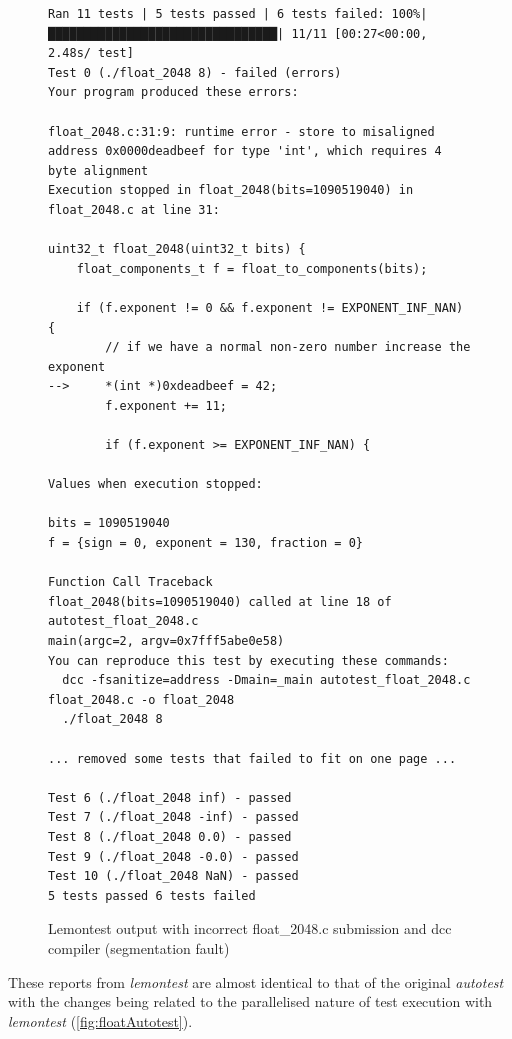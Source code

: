 \documentclass[hidelinks]{report}
\begin{document}
\begin{figure}[h]
	\centering
	\begin{lstlisting}[breaklines=true, linewidth=\linewidth, tabsize=4]
Ran 11 tests | 5 tests passed | 6 tests failed: 100%|████████████████████████████████| 11/11 [00:27<00:00,  2.48s/ test]
Test 0 (./float_2048 8) - failed (errors)
Your program produced these errors:

float_2048.c:31:9: runtime error - store to misaligned address 0x0000deadbeef for type 'int', which requires 4 byte alignment
Execution stopped in float_2048(bits=1090519040) in float_2048.c at line 31:

uint32_t float_2048(uint32_t bits) {
    float_components_t f = float_to_components(bits);

    if (f.exponent != 0 && f.exponent != EXPONENT_INF_NAN) {
        // if we have a normal non-zero number increase the exponent
-->     *(int *)0xdeadbeef = 42;
        f.exponent += 11;

        if (f.exponent >= EXPONENT_INF_NAN) {

Values when execution stopped:

bits = 1090519040
f = {sign = 0, exponent = 130, fraction = 0}

Function Call Traceback
float_2048(bits=1090519040) called at line 18 of autotest_float_2048.c
main(argc=2, argv=0x7fff5abe0e58)
You can reproduce this test by executing these commands:
  dcc -fsanitize=address -Dmain=_main autotest_float_2048.c float_2048.c -o float_2048
  ./float_2048 8

... removed some tests that failed to fit on one page ...

Test 6 (./float_2048 inf) - passed
Test 7 (./float_2048 -inf) - passed
Test 8 (./float_2048 0.0) - passed
Test 9 (./float_2048 -0.0) - passed
Test 10 (./float_2048 NaN) - passed
5 tests passed 6 tests failed
	\end{lstlisting}
	\caption{Lemontest output with incorrect float\_2048.c submission and dcc compiler (segmentation fault)}
	\label{fig:floatTestSegfault}
\end{figure}
These reports from \textit{lemontest} are almost identical to that of the original \textit{autotest} with the changes being related to the parallelised nature of test execution with \textit{lemontest} (\autoref{fig:floatAutotest}).
\end{document}
